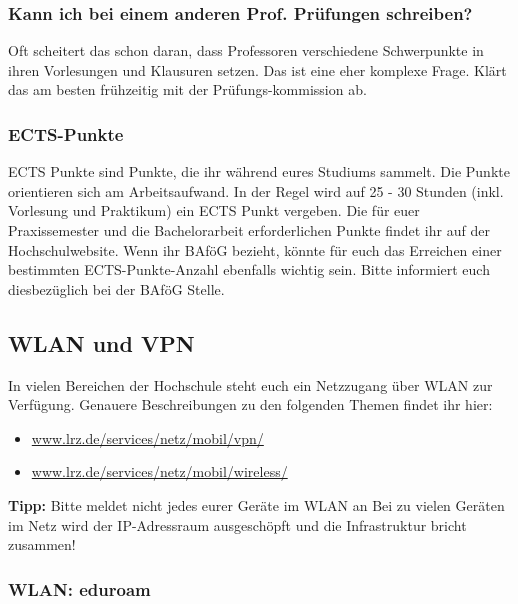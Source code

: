 \subsubsection{Kann ich bei einem anderen Prof. Prüfungen schreiben?}

Oft scheitert das schon daran, dass Professoren verschiedene Schwerpunkte in ihren Vorlesungen und Klausuren setzen. Das ist eine eher komplexe Frage. Klärt das am besten frühzeitig mit der Prüfungs-kommission ab.

\subsubsection{ECTS-Punkte}

ECTS Punkte sind Punkte, die ihr während eures Studiums sammelt. Die Punkte orientieren sich am Arbeitsaufwand. In der Regel wird auf 25 - 30 Stunden (inkl. Vorlesung und Praktikum) ein ECTS Punkt vergeben. Die für euer Praxissemester und die Bachelorarbeit erforderlichen Punkte findet ihr auf der Hochschulwebsite.\doublebreak
Wenn ihr BAföG bezieht, könnte für euch das Erreichen einer bestimmten ECTS-Punkte-Anzahl ebenfalls wichtig sein. Bitte informiert euch diesbezüglich bei der BAföG Stelle.

\subsection{WLAN und VPN}

In vielen Bereichen der Hochschule steht euch ein Netzzugang über WLAN zur Verfügung. Genauere Beschreibungen zu den folgenden Themen findet ihr hier:

\begin{itemize}
	\item{\url{www.lrz.de/services/netz/mobil/vpn/}}
	\item{\url{www.lrz.de/services/netz/mobil/wireless/}}
\end{itemize}
\textbf{Tipp:} Bitte meldet nicht jedes eurer Geräte im WLAN an Bei zu vielen Geräten im Netz wird der IP-Adressraum ausgeschöpft und die Infrastruktur bricht zusammen!

\subsubsection{WLAN: eduroam}

